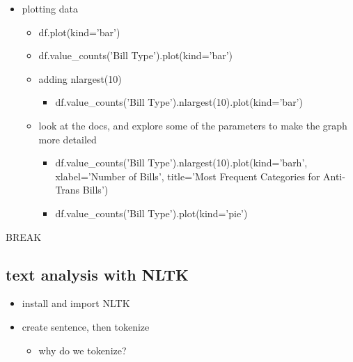 \documentclass[11pt]{article}
\begin{document}
\begin{itemize}
\item plotting data
\begin{itemize}
\item df.plot(kind='bar')
\item df.value\_counts('Bill Type').plot(kind='bar')
\item adding nlargest(10)
\begin{itemize}
\item df.value\_counts('Bill Type').nlargest(10).plot(kind='bar')
\end{itemize}
\item look at the docs, and explore some of the parameters to make the
graph more detailed
\begin{itemize}
\item df.value\_counts('Bill Type').nlargest(10).plot(kind='barh',
xlabel='Number of Bills', title='Most Frequent Categories for
Anti-Trans Bills')
\item df.value\_counts('Bill Type').plot(kind='pie')
\end{itemize}
\end{itemize}
\end{itemize}

BREAK

\subsection{text analysis with NLTK}
\label{sec:orgf69fd70}
\begin{itemize}
\item install and import NLTK
\item create sentence, then tokenize
\begin{itemize}
\item why do we tokenize?
\end{itemize}
\end{itemize}
\end{document}
